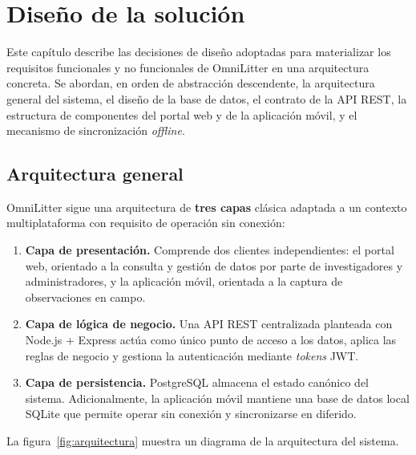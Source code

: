 
\chapter{Diseño de la solución}

Este capítulo describe las decisiones de diseño adoptadas para materializar los
requisitos funcionales y no funcionales de OmniLitter en una arquitectura concreta.
Se abordan, en orden de abstracción descendente, la arquitectura general del sistema,
el diseño de la base de datos, el contrato de la API REST, la estructura de componentes
del portal web y de la aplicación móvil, y el mecanismo de sincronización \textit{offline}.

\section{Arquitectura general}

OmniLitter sigue una arquitectura de \textbf{tres capas} clásica adaptada a un
contexto multiplataforma con requisito de operación sin conexión:

\begin{enumerate}
  \item \textbf{Capa de presentación.} Comprende dos clientes independientes: el portal web,
    orientado a la consulta y gestión de datos por parte de investigadores y administradores, y
    la aplicación móvil, orientada a la captura de observaciones en campo.
  \item \textbf{Capa de lógica de negocio.} Una API REST centralizada planteada con
    Node.js + Express actúa como único punto de acceso a los datos, aplica las reglas de
    negocio y gestiona la autenticación mediante \textit{tokens} JWT.
  \item \textbf{Capa de persistencia.} PostgreSQL almacena el estado canónico del sistema.
    Adicionalmente, la aplicación móvil mantiene una base de datos local SQLite
    que permite operar sin conexión y sincronizarse en diferido.
\end{enumerate}

La figura~\ref{fig:arquitectura} muestra un diagrama de la arquitectura del sistema.



